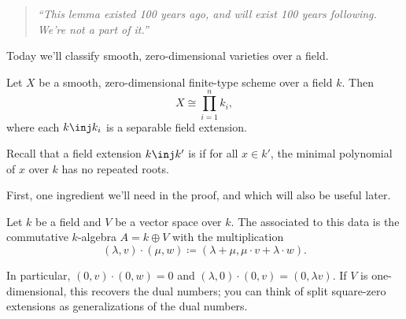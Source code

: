 \begin{quote}\textit{
	``This lemma existed 100 years ago, and will exist 100 years following. We're not a part of it.''
}\end{quote}

Today we'll classify smooth, zero-dimensional varieties over a field.
\begin{thm}
\label{0sch}
Let $X$ be a smooth, zero-dimensional finite-type scheme over a field $k$. Then
\begin{equation}
	X\cong \prod_{i=1}^n k_i,
\end{equation}
where each $k\inj k_i$ is a separable field extension.
\end{thm}
\begin{rem}
Recall that a field extension $k\inj k'$ is  if for all $x\in k'$, the minimal polynomial of $x$
over $k$ has no repeated roots.
\end{rem}
First, one ingredient we'll need in the proof, and which will also be useful later.
\begin{defn}
Let $k$ be a field and $V$ be a vector space over $k$. The  associated to this
data is the commutative $k$-algebra $A = k\oplus V$ with the multiplication
\begin{equation}
	(\lambda, v)\cdot (\mu, w) \coloneqq (\lambda+\mu, \mu\cdot v + \lambda\cdot w).
\end{equation}
\end{defn}
In particular, $(0, v)\cdot (0,w) = 0$ and $(\lambda, 0)\cdot (0,v) = (0, \lambda v)$. If $V$ is one-dimensional,
this recovers the dual numbers; you can think of split square-zero extensions as generalizations of the dual
numbers.

